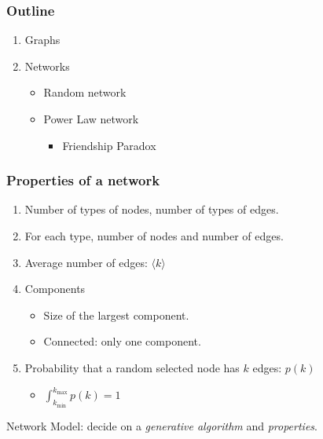\documentclass{beamer}
\begin{document}
\begin{frame}
\frametitle{Outline}
\begin{enumerate}
\item Graphs
\item Networks
\begin{itemize}
\item Random network
\item Power Law network
\begin{itemize}
\item Friendship Paradox
\end{itemize}
\end{itemize}
\end{enumerate}
\end{frame}


\begin{frame}
\frametitle{Properties of a network}
\begin{enumerate}
\item Number of types of nodes, number of types of edges.
\item For each type, number of nodes and number of edges.
\item Average number of edges: $\langle k \rangle$
\item Components
\begin{itemize}
\item Size of the largest component.
\item Connected: only one component.
\end{itemize}
\item Probability that a random selected node has $k$ edges: $p(k)$
\begin{itemize}
\item $\int_{k_{\textrm{min}}}^{k_{\textrm{max}}} p(k) = 1$
\end{itemize}
\end{enumerate}
\end{frame}

\begin{frame}
\begin{center}
Network Model: decide on a \textit{generative algorithm} and \textit{properties}.
\end{center}
\end{frame}
\end{document}
